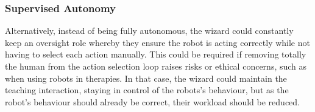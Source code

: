 \documentclass[manuscript, review, anonymous]{acmart}
\newcommand{\ES}[1]{\added[id=ES]{#1}}
\begin{document}

\subsubsection{Supervised Autonomy}

Alternatively, instead of being fully autonomous, the wizard could constantly
keep an oversight role whereby they ensure the robot is acting correctly while
not having to select each action manually. This could be required if removing
totally the human from the action selection loop raises risks or ethical
concerns, such as when using robots in therapies. In that case, the wizard could
maintain the teaching interaction, staying in control of the robots's behaviour,
but as the robot's behaviour should already be correct, their workload should be
reduced.
\end{document}
